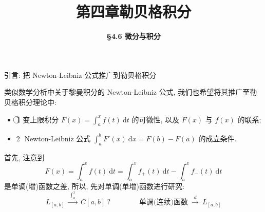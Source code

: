 


\title[第四章\\
勒贝格积分]{\texorpdfstring{\LARGE \bfseries 第四章\quad 勒贝格积分}{第四章 勒贝格积分}} %
\author[\S 4.6\\
微分与积分] %
{\Large \bfseries \S 4.6 微分与积分}
\date{}





\begin{frame}

\titlepage

\end{frame}




\begin{frame}{引言: 把 Newton-Leibniz 公式推广到勒贝格积分}

类似数学分析中关于黎曼积分的 Newton-Leibniz 公式, 我们也希望将其推广至勒贝格积分理论中:
\begin{itemize}
\item \textcircled{1} \alert{变上限积分} $\displaystyle F(x) = \int_a^x f(t) ~ \mathrm{d} t$
  的\alert{可微性}, 以及 $F(x)$ 与 $f(x)$ 的联系;
\item \textcircled{2} Newton-Leibniz 公式
  $\displaystyle \int_a^b F'(x) ~ \mathrm{d} x = F(b) - F(a)$ 的\alert{成立条件}.
\end{itemize}

\pause

首先, 注意到
\[
F(x) = \int_a^x f(t) ~ \mathrm{d} t = \int_a^x f_+(t) ~ \mathrm{d} t - \int_a^x f_-(t) ~ \mathrm{d} t
\]
是\alert{单调(增)函数之差}, 所以, 先对单调(单增)函数进行研究:
\[
L_{[a, b]} \;\xrightarrow{\ \int_a^x\ }\; C[a, b]\ ?
\qquad\qquad
\text{单调(连续)函数}\ \xrightarrow{\ d\ }\ L_{[a, b]}
\]

\end{frame}

